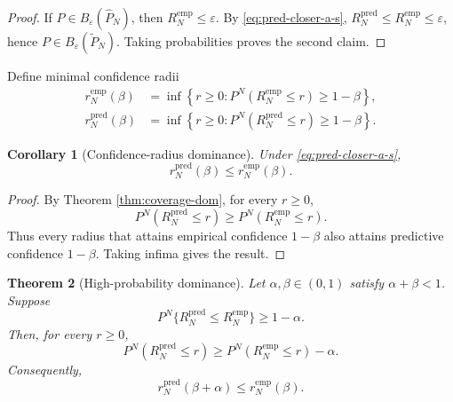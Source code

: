 \documentclass[11pt]{article}
\newtheorem{theorem}{Theorem}[section]
\newtheorem{corollary}[theorem]{Corollary}
\newcommand{\1}{\mathbf{1}}
\newcommand{\Phat}{\widehat P_N}
\newcommand{\Ptil}{\widetilde P_N}
\newcommand{\remp}{r_N^{\mathrm{emp}}}
\newcommand{\rpred}{r_N^{\mathrm{pred}}}
\begin{document}
\begin{proof}
If $P\in B_\varepsilon(\Phat)$, then $R_N^{\mathrm{emp}}\le\varepsilon$. By \eqref{eq:pred-closer-a-s}, $R_N^{\mathrm{pred}}\le R_N^{\mathrm{emp}}\le\varepsilon$, hence $P\in B_\varepsilon(\Ptil)$. Taking probabilities proves the second claim.
\end{proof}

Define minimal confidence radii
\begin{align}
\remp(\beta)&=\inf\left\{r\ge0:P^N(R_N^{\mathrm{emp}}\le r)\ge1-\beta\right\},\label{eq:remp}\\
\rpred(\beta)&=\inf\left\{r\ge0:P^N(R_N^{\mathrm{pred}}\le r)\ge1-\beta\right\}.\label{eq:rpred}
\end{align}

\begin{corollary}[Confidence-radius dominance]\label{cor:radius-dom}
Under \eqref{eq:pred-closer-a-s},
\begin{equation}
    \rpred(\beta)\le \remp(\beta).
\end{equation}
\end{corollary}

\begin{proof}
By Theorem \ref{thm:coverage-dom}, for every $r\ge0$,
\begin{equation}
    P^N(R_N^{\mathrm{pred}}\le r)\ge P^N(R_N^{\mathrm{emp}}\le r).
\end{equation}
Thus every radius that attains empirical confidence $1-\beta$ also attains predictive confidence $1-\beta$. Taking infima gives the result.
\end{proof}

\begin{theorem}[High-probability dominance]\label{thm:hp-radius-dom}
Let $\alpha,\beta\in(0,1)$ satisfy $\alpha+\beta<1$. Suppose
\begin{equation}
    P^N\{R_N^{\mathrm{pred}}\le R_N^{\mathrm{emp}}\}\ge1-\alpha.
\end{equation}
Then, for every $r\ge0$,
\begin{equation}
    P^N(R_N^{\mathrm{pred}}\le r)\ge P^N(R_N^{\mathrm{emp}}\le r)-\alpha.
\end{equation}
Consequently,
\begin{equation}
    \rpred(\beta+\alpha)\le \remp(\beta).
\end{equation}
\end{theorem}
\end{document}
